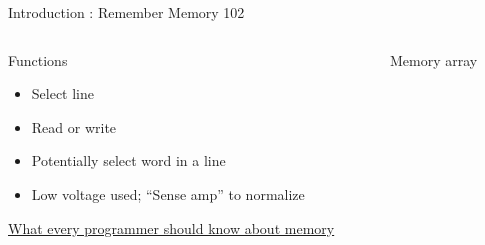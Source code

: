 \begin{Frame}{Introduction : Remember Memory 102}
  \begin{columns}[t]
	\begin{column}{\BW}
      \begin{block}{Functions}
        \begin{itemize}
        \item Select line
        \item Read or write
        \item Potentially select word in a line
        \item Low voltage used; ``Sense amp'' to normalize
        \end{itemize}
      \end{block}

\href{http://dewaele.org/~robbe/thesis/writing/references/what-every-programmer-should-know-about-memory.2007.pdf}{What every programmer should know about memory}
    \end{column}
	\begin{column}{\BW}
      \begin{block}{Memory array}
      \end{block}
      
	\end{column}
\end{columns}

\end{Frame}

